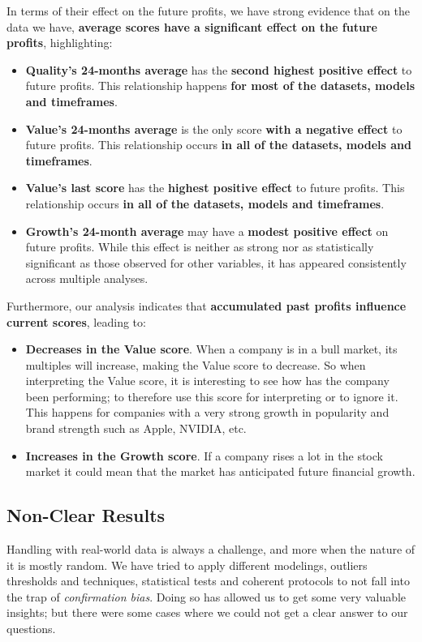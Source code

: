 \documentclass[11pt,english,a4paper,hidelinks]{book}
\begin{document}
\noindent In terms of their effect on the future profits, we have strong evidence that on the data we have, \textbf{average scores have a significant effect on the future profits}, highlighting:
\begin{itemize}
    \item \textbf{Quality's 24-months average} has the \textbf{second highest positive effect} to future profits. This relationship happens \textbf{for most of the datasets, models and timeframes}.
    \item \textbf{Value's 24-months average} is the only score \textbf{with a negative effect} to future profits. This relationship occurs \textbf{in all of the datasets, models and timeframes}.
    \item \textbf{Value's last score} has the \textbf{highest positive effect} to future profits. This relationship occurs \textbf{in all of the datasets, models and timeframes}.
    \item \textbf{Growth's 24-month average} may have a \textbf{modest positive effect} on future profits. While this effect is neither as strong nor as statistically significant as those observed for other variables, it has appeared consistently across multiple analyses.
\end{itemize}

\noindent Furthermore, our analysis indicates that \textbf{accumulated past profits influence current scores}, leading to:
\begin{itemize}
    \item \textbf{Decreases in the Value score}. When a company is in a bull market, its multiples will increase, making the Value score to decrease. So when interpreting the Value score, it is interesting to see how has the company been performing; to therefore use this score for interpreting or to ignore it. This happens for companies with a very strong growth in popularity and brand strength such as Apple, NVIDIA, etc.
    \item \textbf{Increases in the Growth score}. If a company rises a lot in the stock market it could mean that the market has anticipated future financial growth.
\end{itemize}

\subsection{Non-Clear Results}

\noindent Handling with real-world data is always a challenge, and more when the nature of it is mostly random. We have tried to apply different modelings, outliers thresholds and techniques, statistical tests and coherent protocols to not fall into the trap of \textit{confirmation bias}. Doing so has allowed us to get some very valuable insights; but there were some cases where we could not get a clear answer to our questions.
\end{document}
